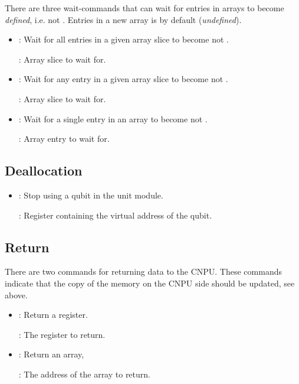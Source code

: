 There are three wait-commands that can wait for entries in arrays to become \emph{defined}, i.e. not .
Entries in a new array is by default  (\emph{undefined}).
\begin{itemize}
  \item {}: Wait for all entries in a given array slice to become not .

        : Array slice to wait for.
  \item {}: Wait for any entry in a given array slice to become not .

        : Array slice to wait for.
  \item {}: Wait for a single entry in an array to become not .

        : Array entry to wait for.
\end{itemize}

\subsection{Deallocation}
\begin{itemize}
  \item {}: Stop using a qubit in the unit module.

        : Register containing the virtual address of the qubit.
\end{itemize}


\subsection{Return}

There are two commands for returning data to the \ac{CNPU}.
These commands indicate that the copy of the memory on the \ac{CNPU} side should be updated, see above.
\begin{itemize}
  \item {}: Return a register.

        : The register to return.
  \item {}: Return an array,

        : The address of the array to return.
\end{itemize}

